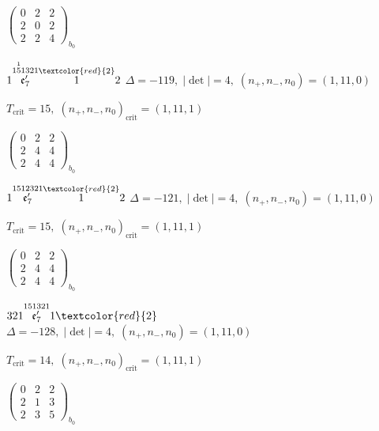 \documentclass[10pt]{article}
\begin{document}
\hspace{2em}$\left(\begin{smallmatrix}0 & 2 & 2 \\ 2 & 0 & 2 \\ 2 & 2 & 4\end{smallmatrix}\right)_{\!b_0}$

\smallskip

$1\overset{1\overset{1}{5}1321}{\mathfrak{e}_7'}\overset{\textcolor{red}{2}}{1}2$ \quad $\Delta=-119,\; |\det|=4,\; (n_+,n_-,n_0)=(1,11,0)$

\hspace{1em}$T_{\text{crit}}=15,\; (n_+,n_-,n_0)_{\text{crit}}=(1,11,1)$

\hspace{2em}$\left(\begin{smallmatrix}0 & 2 & 2 \\ 2 & 4 & 4 \\ 2 & 4 & 4\end{smallmatrix}\right)_{\!b_0}$

\smallskip

$1\overset{1512321}{\mathfrak{e}_7'}\overset{\textcolor{red}{2}}{1}2$ \quad $\Delta=-121,\; |\det|=4,\; (n_+,n_-,n_0)=(1,11,0)$

\hspace{1em}$T_{\text{crit}}=15,\; (n_+,n_-,n_0)_{\text{crit}}=(1,11,1)$

\hspace{2em}$\left(\begin{smallmatrix}0 & 2 & 2 \\ 2 & 4 & 4 \\ 2 & 4 & 4\end{smallmatrix}\right)_{\!b_0}$

\smallskip

$321\overset{151321}{\mathfrak{e}_7'}1\textcolor{red}{2}$ \quad $\Delta=-128,\; |\det|=4,\; (n_+,n_-,n_0)=(1,11,0)$

\hspace{1em}$T_{\text{crit}}=14,\; (n_+,n_-,n_0)_{\text{crit}}=(1,11,1)$

\hspace{2em}$\left(\begin{smallmatrix}0 & 2 & 2 \\ 2 & 1 & 3 \\ 2 & 3 & 5\end{smallmatrix}\right)_{\!b_0}$
\end{document}
